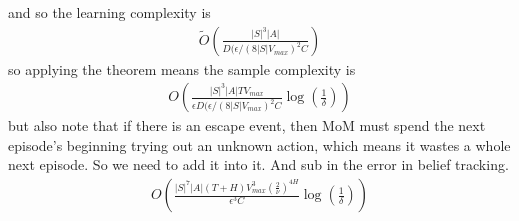 \documentclass[10pt,english]{article}
\begin{document}
and so the learning complexity is
\begin{align}
\tilde{O}\left( \frac{|S|^3|A|}{D(\epsilon/(8|S|V_{max})^2 C} \right)
\end{align}
so applying the theorem means the sample complexity is
\begin{align}
O\left(\frac{|S|^3|A|TV_{max}}{\epsilon D(\epsilon/(8|S|V_{max})^2 C}\log\left(\frac{1}{\delta}\right)\right)
\end{align}
but also note that if there is an escape event, then MoM must spend the next episode's beginning trying out an unknown action, which means it wastes a whole next episode. So we need to add it into it. And sub in the error in belief tracking.
\begin{align}
O\left(\frac{|S|^7|A|(T+H)V_{max}^3 \left(\frac{2}{\nu}\right)^{4H}}{\epsilon^3 C}\log\left(\frac{1}{\delta}\right)\right)
\end{align}
\end{document}
